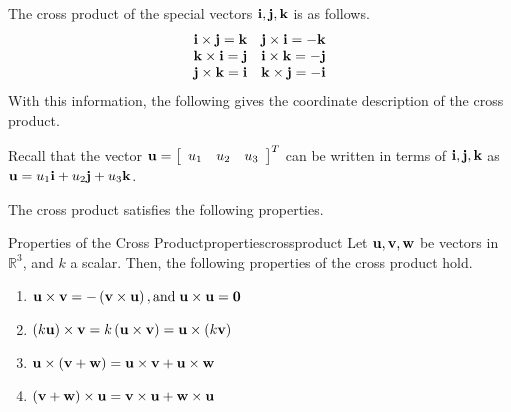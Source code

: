 The cross product of the special vectors ${\bf i}, {\bf j},
{\bf k}$ is as follows.  
\begin{equation*}
\begin{array}{cc}
{\bf i}\times {\bf j}={\bf k} & {\bf j}\times {\bf i}=-{\bf k} \\
{\bf k}\times {\bf i}={\bf j} & {\bf i}\times {\bf k}=-{\bf j} \\
{\bf j}\times {\bf k}={\bf i} & {\bf k}\times {\bf j}=-{\bf i}
\end{array}
\end{equation*}
With this information, the following gives the coordinate description of the
cross product.

Recall that the vector ${\bf u}= \left[ 
\begin{array}{ccc}
u_1 & u_2 & u_3
\end{array}
\right]^T$
can be written in terms of ${\bf i}, {\bf j}, {\bf k}$ as ${\bf u}=u_{1}{\bf i}+u_{2}{\bf j}+u_{3}{\bf k}$. 

The cross product satisfies the following properties.

\begin{proposition}{Properties of the Cross Product}{propertiescrossproduct}
Let ${\bf u}, {\bf v}, {\bf w}$ be vectors in $\mathbb{R}^3$, and $k$ a scalar. Then, the following properties 
of the cross product hold.
\begin{enumerate}
\item 
${\bf u}\times {\bf v}= -\left( {\bf v}\times {\bf u}\right), 
\mbox{and} \; {\bf u}\times {\bf u}={\bf 0}$
\item 
$\left( k {\bf u}\right)\times {\bf v}= k \left( {\bf u}\times {\bf v}\right) 
={\bf u}\times \left( k {\bf v}\right)$
\item
${\bf u}\times \left( {\bf v}+{\bf w}\right) ={\bf u}\times {\bf v}+{\bf u}\times {\bf w}$
\item 
$\left( {\bf v}+{\bf w}\right) \times {\bf u}={\bf v} \times {\bf u}+{\bf w}\times {\bf u}$
\end{enumerate}
\end{proposition}

